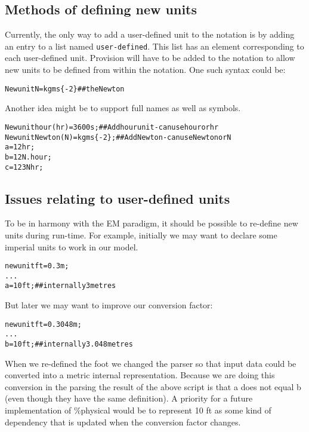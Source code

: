 \documentclass[a4paper]{article}
\begin{document}
\subsection{Methods of defining new units}


Currently, the only way to add a user-defined unit to the notation is by adding 
an entry to a list named
\texttt{user-defined}. This list has an element corresponding to each 
user-defined unit. Provision will have to
be added to the notation to allow new units to be defined from within the 
notation. One such syntax could be:

\begin{alltt}
New unit N = kgms\{-2\} ## the Newton
\end{alltt}

Another idea might be to support full names as well as symbols.

\begin{alltt}
New unit hour (hr) = 3600 s;     ## Add hour unit - can use hour or hr
New unit Newton (N) = kgms\{-2\};  ## Add Newton - can use Newton or N
a = 12 hr;
b = 12 N.hour;
c = 123 Nhr;
\end{alltt}

\subsection{Issues relating to user-defined units}

To be in harmony with the EM paradigm, it should be possible to re-define new 
units during run-time.
For example, initially we may want to declare some imperial units to work in 
our model.

\begin{alltt}
new unit ft = 0.3 m;
...
a = 10 ft; ## internally 3 metres
\end{alltt}

But later we may want to improve our conversion factor:
\begin{alltt}
new unit ft = 0.3048 m;
...
b = 10 ft; ## internally 3.048 metres
\end{alltt}

When we re-defined the foot we changed the parser so that input data could be 
converted into a metric internal representation. Because we are doing this 
conversion in the parsing the result of the above script is that a does not
equal b (even though they have the same definition). A priority for a future 
implementation of \%physical would be
to represent 10 ft as some kind of dependency that is updated when the 
conversion factor changes.
\end{document}
